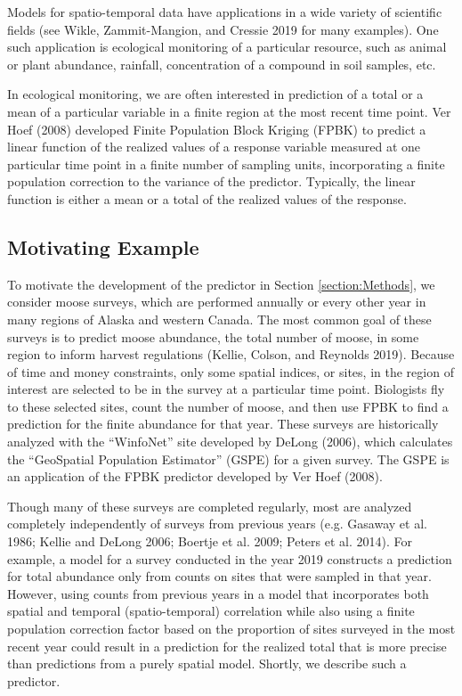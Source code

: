 \documentclass[smallextended]{svjour3}       %
\begin{document}
Models for spatio-temporal data have applications in a wide variety of
scientific fields (see Wikle, Zammit-Mangion, and Cressie 2019 for many
examples). One such application is ecological monitoring of a particular
resource, such as animal or plant abundance, rainfall, concentration of
a compound in soil samples, etc.

In ecological monitoring, we are often interested in prediction of a
total or a mean of a particular variable in a finite region at the most
recent time point. Ver Hoef (2008) developed Finite Population Block
Kriging (FPBK) to predict a linear function of the realized values of a
response variable measured at one particular time point in a finite
number of sampling units, incorporating a finite population correction
to the variance of the predictor. Typically, the linear function is
either a mean or a total of the realized values of the response.

\hypertarget{motivating-example}{%
\subsection{Motivating Example}\label{motivating-example}}

To motivate the development of the predictor in Section
\ref{section:Methods}, we consider moose surveys, which are performed
annually or every other year in many regions of Alaska and western
Canada. The most common goal of these surveys is to predict moose
abundance, the total number of moose, in some region to inform harvest
regulations (Kellie, Colson, and Reynolds 2019). Because of time and
money constraints, only some spatial indices, or sites, in the region of
interest are selected to be in the survey at a particular time point.
Biologists fly to these selected sites, count the number of moose, and
then use FPBK to find a prediction for the finite abundance for that
year. These surveys are historically analyzed with the ``WinfoNet'' site
developed by DeLong (2006), which calculates the ``GeoSpatial Population
Estimator'' (GSPE) for a given survey. The GSPE is an application of the
FPBK predictor developed by Ver Hoef (2008).

Though many of these surveys are completed regularly, most are analyzed
completely independently of surveys from previous years (e.g. Gasaway et
al. 1986; Kellie and DeLong 2006; Boertje et al. 2009; Peters et al.
2014). For example, a model for a survey conducted in the year 2019
constructs a prediction for total abundance only from counts on sites
that were sampled in that year. However, using counts from previous
years in a model that incorporates both spatial and temporal
(spatio-temporal) correlation while also using a finite population
correction factor based on the proportion of sites surveyed in the most
recent year could result in a prediction for the realized total that is
more precise than predictions from a purely spatial model. Shortly, we
describe such a predictor.
\end{document}
